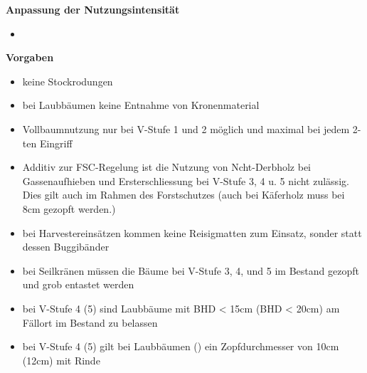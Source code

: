 \documentclass{article}
\begin{document}
\textbf{Anpassung der Nutzungsintensität}\\

\begin{itemize}
	
	\item 



\end{itemize} 


\textbf{Vorgaben}\\

\begin{itemize}
	
	\item keine Stockrodungen
	
	\item bei Laubbäumen keine Entnahme von Kronenmaterial
	
	\item Vollbaumnutzung nur bei V-Stufe 1 und 2 möglich und maximal bei jedem 2-ten Eingriff
	
	\item Additiv zur FSC-Regelung ist die Nutzung von Ncht-Derbholz bei Gassenaufhieben und Ersterschliessung bei V-Stufe 3, 4 u. 5 nicht zulässig. Dies gilt auch im Rahmen des Forstschutzes (auch bei Käferholz muss bei 8cm gezopft werden.)
	
	\item bei Harvestereinsätzen kommen keine Reisigmatten zum Einsatz, sonder statt dessen Buggibänder
	
	\item bei Seilkränen müssen die Bäume bei V-Stufe 3, 4, und 5 im Bestand gezopft und grob entastet werden
	
	\item bei V-Stufe 4 (5) sind Laubbäume mit BHD < 15cm (BHD < 20cm) am Fällort im Bestand zu belassen
	
	\item bei V-Stufe 4 (5) gilt bei Laubbäumen () ein Zopfdurchmesser von 10cm (12cm) mit Rinde
	
	
	
\end{itemize} 


\end{document}
